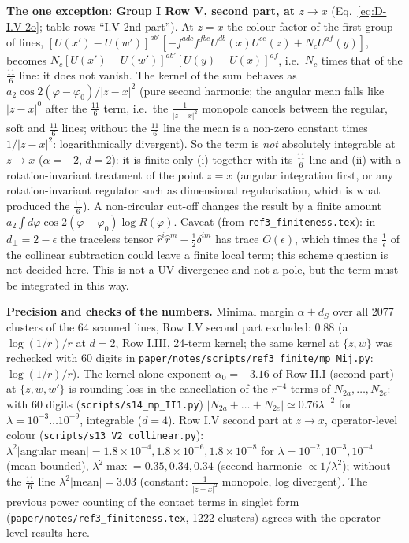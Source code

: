 \documentclass[9pt]{article}
\numberwithin{equation}{section}
\begin{document}
\noindent\textbf{The one exception: Group I Row V, second part, at $z\to x$} (Eq.~\eqref{eq:D-I.V-2o}; table rows ``I.V 2nd part''). At $z=x$ the colour factor of the first group of lines, $[U(x')-U(w')]^{ab'}[-f^{adc}f^{fbe}U^{db}(x)U^{ce}(z)+N_cU^{af}(y)]$, becomes $N_c[U(x')-U(w')]^{ab'}[U(y)-U(x)]^{af}$, i.e.\ $N_c$ times that of the $\frac{11}{6}$ line: it does not vanish. The kernel of the sum behaves as $a_2\cos2(\varphi-\varphi_0)/|z-x|^2$ (pure second harmonic; the angular mean falls like $|z-x|^0$ after the $\frac{11}{6}$ term, i.e.\ the $\frac{1}{|z-x|^2}$ monopole cancels between the regular, soft and $\frac{11}{6}$ lines; without the $\frac{11}{6}$ line the mean is a non-zero constant times $1/|z-x|^2$: logarithmically divergent). So the term is \emph{not} absolutely integrable at $z\to x$ ($\alpha=-2$, $d=2$): it is finite only (i) together with its $\frac{11}{6}$ line and (ii) with a rotation-invariant treatment of the point $z=x$ (angular integration first, or any rotation-invariant regulator such as dimensional regularisation, which is what produced the $\frac{11}{6}$). A non-circular cut-off changes the result by a finite amount $a_2\int d\varphi\cos2(\varphi-\varphi_0)\log R(\varphi)$. Caveat (from \texttt{ref3\_finiteness.tex}): in $d_\perp=2-\epsilon$ the traceless tensor $\hat r^i\hat r^m-\frac12\delta^{im}$ has trace $O(\epsilon)$, which times the $\frac1\epsilon$ of the collinear subtraction could leave a finite local term; this scheme question is not decided here. This is not a UV divergence and not a pole, but the term must be integrated in this way.

\noindent\textbf{Precision and checks of the numbers.} Minimal margin $\alpha+d_S$ over all 2077 clusters of the 64 scanned lines, Row I.V second part excluded: $0.88$ (a $\log(1/r)/r$ at $d=2$, Row I.III, 24-term kernel; the same kernel at $\{z,w\}$ was rechecked with 60 digits in \texttt{paper/notes/scripts/ref3\_finite/mp\_Mij.py}: $\log(1/r)/r$). The kernel-alone exponent $\alpha_0=-3.16$ of Row II.I (second part) at $\{z,w,w'\}$ is rounding loss in the cancellation of the $r^{-4}$ terms of $N_{2a},\dots,N_{2e}$: with 60 digits (\texttt{scripts/s14\_mp\_II1.py}) $|N_{2a}+\dots+N_{2e}|\simeq0.76\lambda^{-2}$ for $\lambda=10^{-3}\dots10^{-9}$, integrable ($d=4$). Row I.V second part at $z\to x$, operator-level colour (\texttt{scripts/s13\_V2\_collinear.py}): $\lambda^2|\text{angular mean}|=1.8\times10^{-4},1.8\times10^{-6},1.8\times10^{-8}$ for $\lambda=10^{-2},10^{-3},10^{-4}$ (mean bounded), $\lambda^2\max=0.35,0.34,0.34$ (second harmonic $\propto1/\lambda^2$); without the $\frac{11}{6}$ line $\lambda^2|\text{mean}|=3.03$ (constant: $\frac{1}{|z-x|^2}$ monopole, log divergent). The previous power counting of the contact terms in singlet form (\texttt{paper/notes/ref3\_finiteness.tex}, 1222 clusters) agrees with the operator-level results here.
\end{document}
